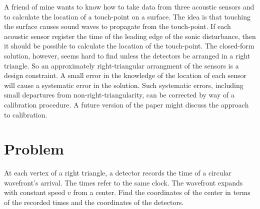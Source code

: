 \documentclass[twocolumn]{article}
\begin{document}
A friend of mine wants to know how to take data from three acoustic sensors and
to calculate the location of a touch-point on a surface.  The idea is that
touching the surface causes sound waves to propagate from the touch-point. If
each acoustic sensor register the time of the leading edge of the sonic
disturbance, then it should be possible to calculate the location of the
touch-point.  The closed-form solution, however, seems hard to find unless the
detectors be arranged in a right triangle.  So an approximately
right-triangular arrangment of the sensors is a design constraint.  A small
error in the knowledge of the location of each sensor will cause a systematic
error in the solution.  Such systematic errors, including small departures from
non-right-triangularity, can be corrected by way of a calibration procedure.  A
future version of the paper might discuss the approach to calibration.

\section{Problem}

At each vertex of a right triangle, a detector records the time of a circular
wavefront's arrival.  The times refer to the same clock.  The wavefront expands
with constant speed $v$ from a center.  Find the coordinates of the center in
terms of the recorded times and the coordinates of the detectors.
\end{document}
